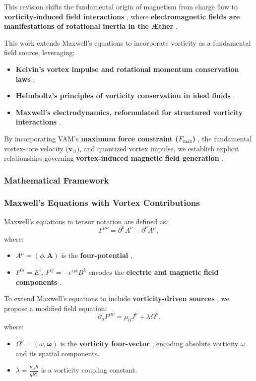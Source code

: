 This revision shifts the fundamental origin of magnetism from charge flow to \textbf{vorticity-induced field interactions} , where \textbf{electromagnetic fields are manifestations of rotational inertia in the Æther} .

This work extends Maxwell's equations to incorporate vorticity as a fundamental field source, leveraging:
\begin{itemize}
    \item \textbf{Kelvin's vortex impulse and rotational momentum conservation laws}  \cite{kelvin1867}.
    \item \textbf{Helmholtz's principles of vorticity conservation in ideal fluids}  \cite{helmholtz1858}.
    \item \textbf{Maxwell's electrodynamics, reformulated for structured vorticity interactions}  \cite{maxwell1861}.
\end{itemize}
By incorporating VAM's \textbf{maximum force constraint (\( F_{\max} \))} , the fundamental vortex-core velocity (\( \mathbf{v}_{\scriptscriptstyle\boldsymbol{\circlearrowleft}} \)), and quantized vortex impulse, we establish explicit relationships governing \textbf{vortex-induced magnetic field generation} .

\subsubsection*{Mathematical Framework}

\subsubsection*{Maxwell's Equations with Vortex Contributions}
Maxwell's equations in tensor notation are defined as:
\begin{equation*}
    F^{\mu\nu} = \partial^\mu A^\nu - \partial^\nu A^\mu,
\end{equation*}
where:
\begin{itemize}
    \item \( A^\mu = (\phi, \mathbf{A}) \) is the \textbf{four-potential} ,
    \item \( F^{0i} = E^i \), \( F^{ij} = -\epsilon^{ijk} B^k \) encodes the \textbf{electric and magnetic field components} .
\end{itemize}

To extend Maxwell's equations to include \textbf{vorticity-driven sources} , we propose a modified field equation:
\begin{equation*}
    \partial_\mu F^{\mu\nu} = \mu_0 J^\nu + \lambda \Omega^\nu.
\end{equation*}
where:
\begin{itemize}
    \item \( \Omega^\nu = (\omega, \mathbf{\omega}) \) is the \textbf{vorticity four-vector} , encoding absolute vorticity \( \omega \) and its spatial components.
    \item \( \lambda = \frac{\mathbf{v}_{\scriptscriptstyle\boldsymbol{\circlearrowleft}} \hbar}{q R_c^2} \) is a vorticity coupling constant.
\end{itemize}

